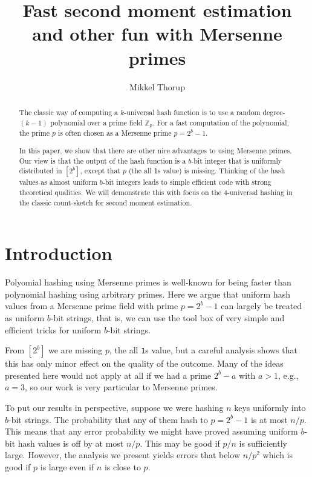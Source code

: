 \documentclass[12pt]{article}
\title{Fast second moment estimation and other fun with Mersenne primes}
\author{Mikkel Thorup}
\begin{document}
\maketitle 

\begin{abstract}
The classic way of computing a $k$-universal hash function is
to use a random degree-$(k-1)$ polynomial over a prime field $\mathbb Z_p$.
For a fast computation of the polynomial, the prime $p$ is often
chosen as a Mersenne prime $p=2^b-1$.

In this paper, we show that there are other nice advantages to using
Mersenne primes. Our view is that the output of the hash function is a
$b$-bit integer that is uniformly distributed in $[2^b]$, except that
$p$ (the all \texttt1s value) is missing. Thinking of the hash
values as almost uniform $b$-bit integers leads to simple efficient code 
with strong theoretical qualities. We will demonstrate this with focus on the
4-universal hashing in the classic count-sketch for second moment
estimation.
\end{abstract}

\section{Introduction}
Polyomial hashing using Mersenne primes is well-known for being faster
than polynomial hashing using arbitrary primes. Here we argue that
uniform hash values from a Mersenne prime field with prime $p=2^b-1$
can largely be treated as uniform $b$-bit strings, that is, we can use
the tool box of very simple and efficient tricks for uniform
$b$-bit strings.

From $[2^b]$ we are missing $p$, the all \texttt1s value, but
a careful analysis shows that this has only minor effect
on the quality of the outcome. Many of the ideas presented
here would not apply at all if we had a prime $2^b-a$ with $a>1$, e.g.,
$a=3$, so our work is very particular to Mersenne primes.

To put our results in perspective, suppose we were hashing $n$ keys uniformly
into $b$-bit strings. The probability that any of them hash
to $p=2^b-1$ is at most $n/p$. This means that any error
probability we might have proved assuming uniform $b$-bit hash
values is off by at most $n/p$. This may be good if $p/n$ is
sufficiently large. However, the analysis we present yields 
errors that below $n/p^2$ which is good if $p$ is large
even if $n$ is close to $p$.
\end{document}
